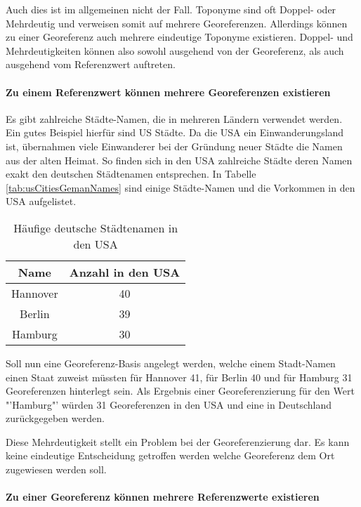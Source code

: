 					Auch dies ist im allgemeinen nicht der Fall. 
					Toponyme sind oft Doppel- oder Mehrdeutig und verweisen somit auf mehrere Georeferenzen.
					Allerdings können zu einer Georeferenz auch mehrere eindeutige Toponyme existieren.
					Doppel- und Mehrdeutigkeiten können also sowohl ausgehend von der Georeferenz, als auch ausgehend vom Referenzwert auftreten.

				\paragraph{Zu einem Referenzwert können mehrere Georeferenzen existieren}

					Es gibt zahlreiche Städte-Namen, die in mehreren Ländern verwendet werden.
					Ein gutes Beispiel hierfür sind US Städte. 
					Da die USA ein Einwanderungsland ist, übernahmen viele Einwanderer bei der Gründung neuer Städte die Namen aus der alten Heimat. 
					So finden sich in den USA zahlreiche Städte deren Namen exakt den deutschen Städtenamen entsprechen. 
					In Tabelle \ref{tab:usCitiesGemanNames} sind einige Städte-Namen und die Vorkommen in den USA aufgelistet.
					
					\begin{table}[htpb]
						\caption{Häufige deutsche Städtenamen in den USA} 
						\centering
						\begin{tabular}{|c|c|}
							\hline
							Name & Anzahl in den USA \\
							\hline\hline
							Hannover & 40 \\
							\hline
							Berlin & 39 \\
							\hline
							Hamburg & 30 \\
							\hline
						\end{tabular}
						\label{tab:usCitiesGermanNames} 
					\end{table}


					Soll nun eine Georeferenz-Basis angelegt werden, welche einem Stadt-Namen einen Staat zuweist müssten für Hannover 41, für Berlin 40 und für Hamburg 31 Georeferenzen hinterlegt sein.
					Als Ergebnis einer Georeferenzierung für den Wert "'Hamburg"' würden 31 Georeferenzen in den USA und eine in Deutschland zurückgegeben werden. 

					Diese Mehrdeutigkeit stellt ein Problem bei der Georeferenzierung dar.
					Es kann keine eindeutige Entscheidung getroffen werden welche Georeferenz dem Ort zugewiesen werden soll. 

				\paragraph{Zu einer Georeferenz können mehrere Referenzwerte existieren}

